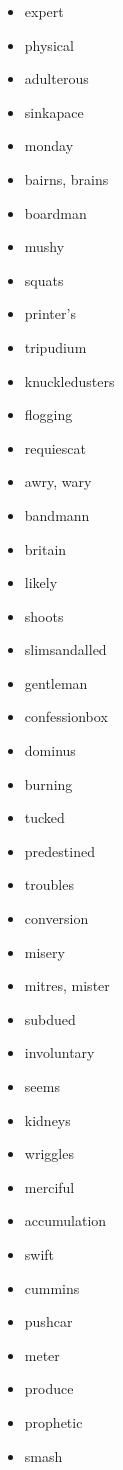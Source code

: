\documentclass{article}
\begin{document}
\begin{itemize}
    \item expert
    \item physical
    \item adulterous
    \item sinkapace
    \item monday
    \item bairns, brains
    \item boardman
    \item mushy
    \item squats
    \item printer's
    \item tripudium
    \item knuckledusters
    \item flogging
    \item requiescat
    \item awry, wary
    \item bandmann
    \item britain
    \item likely
    \item shoots
    \item slimsandalled
    \item gentleman
    \item confessionbox
    \item dominus
    \item burning
    \item tucked
    \item predestined
    \item troubles
    \item conversion
    \item misery
    \item mitres, mister
    \item subdued
    \item involuntary
    \item seems
    \item kidneys
    \item wriggles
    \item merciful
    \item accumulation
    \item swift
    \item cummins
    \item pushcar
    \item meter
    \item produce
    \item prophetic
    \item smash

\end{itemize}
\end{document}
